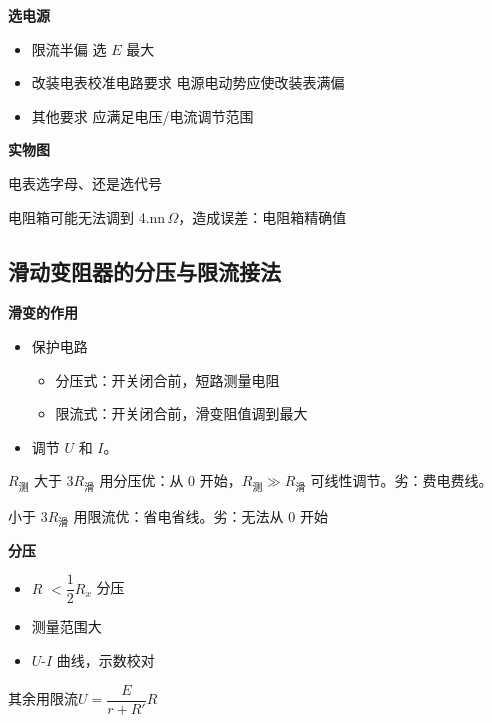 \textbf{选电源}

\begin{itemize}
\item 限流半偏 \quad 选 $E$ 最大
\item 改装电表校准电路要求 \quad 电源电动势应使改装表满偏
\item 其他要求 \quad 应满足电压/电流调节范围
\end{itemize}

\textbf{实物图}


电表选字母、还是选代号

电阻箱可能无法调到 4.nn$\,\Omega$，造成误差：电阻箱精确值

\subsection{滑动变阻器的分压与限流接法}
\textbf{滑变的作用}
\begin{itemize}
\item 保护电路
  \begin{itemize}
  \item 分压式：开关闭合前，短路测量电阻
  \item 限流式：开关闭合前，滑变阻值调到最大
  \end{itemize}
\item 调节 $U$ 和 $I$。
\end{itemize}

$R_{\text{测}}$ 大于 $3R_{\text{滑}}$ 用分压\quad 优：从 $0$ 开始，$R_{\text{测}}\gg R_{\text{滑}}$ 可线性调节。\quad 劣：费电费线。

小于 $3R_{\text{滑}}$ 用限流\quad 优：省电省线。\quad 劣：无法从 $0$ 开始

\textbf{分压}
\begin{itemize}
\item $R$ $<\dfrac{1}{2}R_x$ 分压
\item 测量范围大
\item $U$-$I$ 曲线，示数校对 %
\end{itemize}
其余用限流\qquad $U=\dfrac{E}{r+R'}R$

